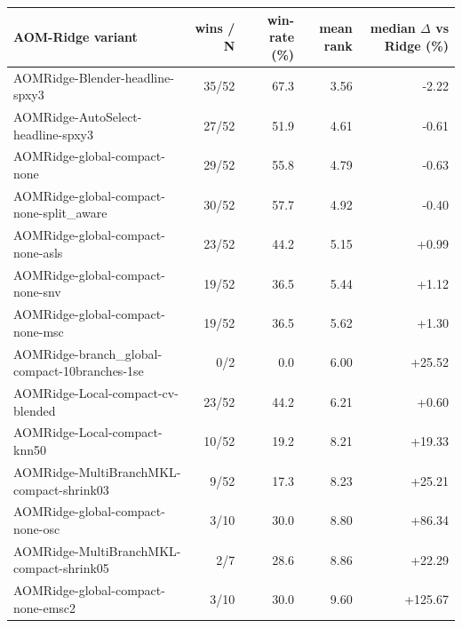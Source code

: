 \begin{tabular}{lrrrr}
\toprule
AOM-Ridge variant & wins / N & win-rate (\%) & mean rank & median $\Delta$ vs Ridge (\%) \\
\midrule
AOMRidge-Blender-headline-spxy3 & 35/52 & 67.3 & 3.56 & -2.22 \\
AOMRidge-AutoSelect-headline-spxy3 & 27/52 & 51.9 & 4.61 & -0.61 \\
AOMRidge-global-compact-none & 29/52 & 55.8 & 4.79 & -0.63 \\
AOMRidge-global-compact-none-split\_aware & 30/52 & 57.7 & 4.92 & -0.40 \\
AOMRidge-global-compact-none-asls & 23/52 & 44.2 & 5.15 & +0.99 \\
AOMRidge-global-compact-none-snv & 19/52 & 36.5 & 5.44 & +1.12 \\
AOMRidge-global-compact-none-msc & 19/52 & 36.5 & 5.62 & +1.30 \\
AOMRidge-branch\_global-compact-10branches-1se & 0/2 & 0.0 & 6.00 & +25.52 \\
AOMRidge-Local-compact-cv-blended & 23/52 & 44.2 & 6.21 & +0.60 \\
AOMRidge-Local-compact-knn50 & 10/52 & 19.2 & 8.21 & +19.33 \\
AOMRidge-MultiBranchMKL-compact-shrink03 & 9/52 & 17.3 & 8.23 & +25.21 \\
AOMRidge-global-compact-none-osc & 3/10 & 30.0 & 8.80 & +86.34 \\
AOMRidge-MultiBranchMKL-compact-shrink05 & 2/7 & 28.6 & 8.86 & +22.29 \\
AOMRidge-global-compact-none-emsc2 & 3/10 & 30.0 & 9.60 & +125.67 \\
\bottomrule
\end{tabular}


